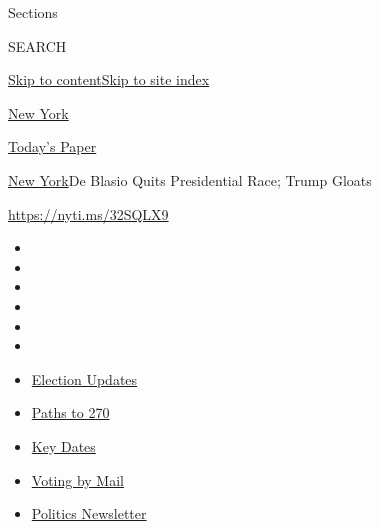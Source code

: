 Sections

SEARCH

\protect\hyperlink{site-content}{Skip to
content}\protect\hyperlink{site-index}{Skip to site index}

\href{https://www.nytimes3xbfgragh.onion/section/nyregion}{New York}

\href{https://myaccount.nytimes3xbfgragh.onion/auth/login?response_type=cookie\&client_id=vi}{}

\href{https://www.nytimes3xbfgragh.onion/section/todayspaper}{Today's
Paper}

\href{/section/nyregion}{New York}\textbar{}De Blasio Quits Presidential
Race; Trump Gloats

\url{https://nyti.ms/32SQLX9}

\begin{itemize}
\item
\item
\item
\item
\item
\item
\end{itemize}

\begin{itemize}
\item
  \href{https://www.nytimes3xbfgragh.onion/live/2020/09/11/us/trump-vs-biden?action=click\&pgtype=Article\&state=default\&region=TOP_BANNER\&context=storylines_menu}{Election
  Updates}
\item
  \href{https://www.nytimes3xbfgragh.onion/interactive/2020/us/elections/election-states-biden-trump.html?action=click\&pgtype=Article\&state=default\&region=TOP_BANNER\&context=storylines_menu}{Paths
  to 270}
\item
  \href{https://www.nytimes3xbfgragh.onion/interactive/2019/us/elections/2020-presidential-election-calendar.html?action=click\&pgtype=Article\&state=default\&region=TOP_BANNER\&context=storylines_menu}{Key
  Dates}
\item
  \href{https://www.nytimes3xbfgragh.onion/interactive/2020/08/31/us/politics/vote-by-mail-deadlines.html?action=click\&pgtype=Article\&state=default\&region=TOP_BANNER\&context=storylines_menu}{Voting
  by Mail}
\item
  \href{https://www.nytimes3xbfgragh.onion/newsletters/politics?action=click\&pgtype=Article\&state=default\&region=TOP_BANNER\&context=storylines_menu}{Politics
  Newsletter}
\end{itemize}

